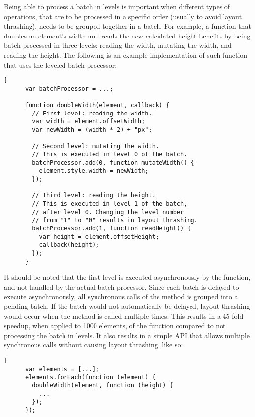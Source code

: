 \documentclass[]{llncs}
\begin{document}
    Being able to process a batch in levels is important when different types of operations, that are to be processed in a specific order (usually to avoid layout thrashing), needs to be grouped together in a batch.
    For example, a function that doubles an element's width and reads the new calculated height benefits by being batch processed in three levels: reading the width, mutating the width, and reading the height.
    The following is an example implementation of such function that uses the leveled batch processor:

    \begin{lstlisting}[gobble=6,label={},caption={},captionpos=b]]
      var batchProcessor = ...;

      function doubleWidth(element, callback) {
        // First level: reading the width.
        var width = element.offsetWidth;
        var newWidth = (width * 2) + "px";

        // Second level: mutating the width.
        // This is executed in level 0 of the batch.
        batchProcessor.add(0, function mutateWidth() {
          element.style.width = newWidth;
        });

        // Third level: reading the height.
        // This is executed in level 1 of the batch,
        // after level 0. Changing the level number
        // from "1" to "0" results in layout thrashing.
        batchProcessor.add(1, function readHeight() {
          var height = element.offsetHeight;
          callback(height);
        });
      }
    \end{lstlisting}

    \noindent
    It should be noted that the first level is executed asynchronously by the function, and not handled by the actual batch processor.
    Since each batch is delayed to execute asynchronously, all synchronous calls of the method is grouped into a pending batch.
    If the batch would not automatically be delayed, layout thrashing would occur when the method is called multiple times.
    This results in a 45-fold speedup, when applied to 1000 elements, of the function compared to not processing the batch in levels.
    It also results in a simple API that allows multiple synchronous calls without causing layout thrashing, like so:

    \begin{lstlisting}[gobble=6,label={},caption={},captionpos=b]]
      var elements = [...];
      elements.forEach(function (element) {
        doubleWidth(element, function (height) {
          ...
        });
      });
    \end{lstlisting}
\end{document}
